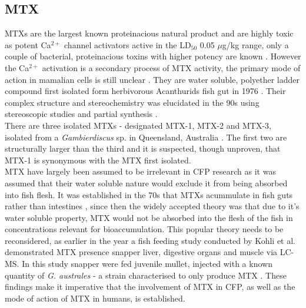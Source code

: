 \documentclass[12pt]{article}
\begin{document}
\subsection{MTX}

MTXs are the largest known proteinacious natural product \cite{yokoyama1988some,murata1993structure} and are highly toxic as potent Ca$^{2+}$ channel activators active in the LD$_{50}$ 0.05 $\mu$g/kg range, only a couple of bacterial, proteinacious toxins with higher potency are known \cite{yokoyama1988some,murata1993structure}. However the Ca$^{2+}$ activation is a secondary process of MTX activity, the primary mode of action in mamalian cells  is still unclear \cite{van2000diversity}. They are water soluble, polyether ladder compound first isolated form herbivorous Acanthurids fish gut in 1976 \cite{yasumoto1976toxicity}. Their complex structure and stereochemistry was elucidated in the 90s using stereoscopic studies and partial synthesis \cite{murata1993structure,murata1994structure,satake1995structural,nonomura1996complete,zheng1996complete}. \\
There are three isolated MTXs - designated MTX-1, MTX-2 and MTX-3, isolated from a \emph{Gambierdiscus} sp. in Queensland, Australia \cite{holmes1994purification}. The first two are structurally larger than the third and it is suspected, though unproven, that MTX-1 is synonymous with the MTX first isolated. \\ %
MTX have largely been assumed to be irrelevant in CFP research as it was assumed that their water soluble nature would exclude it from being absorbed into fish flesh. It was established in the 70s that MTXs acummulate in fish guts rather than intestines \cite{yasumoto1976toxicity}, since then the widely accepted theory was that due to it's water soluble property, MTX would not be absorbed into the flesh of the fish in concentrations relevant for bioaccumulation. This popular theory needs to be reconsidered, as earlier in the year a fish feeding study conducted by Kohli et al. demonstrated MTX presence snapper liver, digestive organs and muscle via LC-MS. In this study snapper were fed juvenile mullet, injected with a known quantity of \emph{G. australes} - a strain characterised to only produce MTX \cite{kohli2014feeding}. These findings make it imperative that the involvement of MTX in CFP, as well as the mode of action of MTX in humans, is established. 

\end{document}
